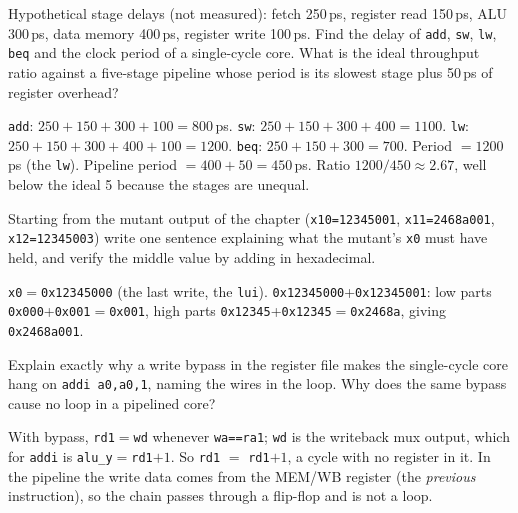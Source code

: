 \begin{exercise}[medium]\label{ex:m05h}
Hypothetical stage delays (not measured): fetch 250\,ps, register read
150\,ps, ALU 300\,ps, data memory 400\,ps, register write 100\,ps.
Find the delay of \texttt{add}, \texttt{sw}, \texttt{lw}, \texttt{beq}
and the clock period of a single-cycle core. What is the ideal
throughput ratio against a five-stage pipeline whose period is its
slowest stage plus 50\,ps of register overhead?
\end{exercise}
\begin{solution}[hint]
\texttt{add}: $250+150+300+100=800$\,ps. \texttt{sw}: $250+150+300+400=1100$.
\texttt{lw}: $250+150+300+400+100=1200$. \texttt{beq}: $250+150+300=700$.
Period $=1200$\,ps (the \texttt{lw}). Pipeline period $=400+50=450$\,ps.
Ratio $1200/450\approx2.67$, well below the ideal 5 because the stages
are unequal.
\end{solution}

\begin{exercise}[medium]\label{ex:m05i}
Starting from the mutant output of the chapter
(\texttt{x10=12345001}, \texttt{x11=2468a001}, \texttt{x12=12345003})
write one sentence explaining what the mutant's \texttt{x0} must have
held, and verify the middle value by adding in hexadecimal.
\end{exercise}
\begin{solution}[hint]
\texttt{x0}$=$\texttt{0x12345000} (the last write, the \texttt{lui}).
\texttt{0x12345000}+\texttt{0x12345001}: low parts
\texttt{0x000}+\texttt{0x001}$=$\texttt{0x001}, high parts
\texttt{0x12345}+\texttt{0x12345}$=$\texttt{0x2468a}, giving
\texttt{0x2468a001}.
\end{solution}

\begin{exercise}[hard]\label{ex:h05d}
Explain exactly why a write bypass in the register file makes the
single-cycle core hang on \texttt{addi a0,a0,1}, naming the wires in
the loop. Why does the same bypass cause no loop in a pipelined core?
\end{exercise}
\begin{solution}[hint]
With bypass, \texttt{rd1}$=$\texttt{wd} whenever \texttt{wa==ra1};
\texttt{wd} is the writeback mux output, which for \texttt{addi} is
\texttt{alu\_y}$=$\texttt{rd1}$+1$. So \texttt{rd1} $=$
\texttt{rd1}$+1$, a cycle with no register in it. In the pipeline the
write data comes from the MEM/WB register (the \emph{previous}
instruction), so the chain passes through a flip-flop and is not a loop.
\end{solution}

